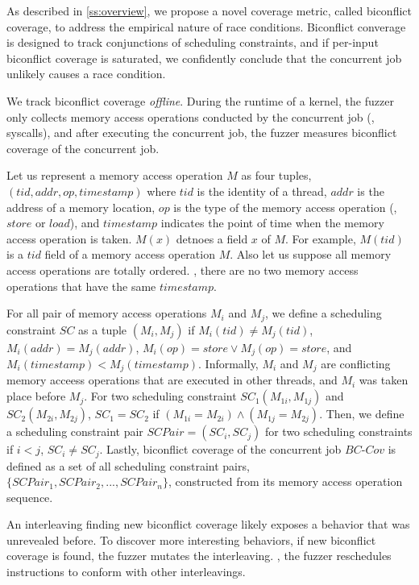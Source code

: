 As described in \autoref{ss:overview}, we propose a novel coverage
metric, called biconflict coverage, to address the empirical nature of
race conditions.
%
Biconflict converage is designed to track conjunctions of scheduling
constraints, and if per-input biconflict coverage is saturated, we
confidently conclude that the concurrent job unlikely causes a race
condition.

We track biconflict coverage \textit{offline}. During the runtime of a
kernel, the fuzzer only collects memory access operations conducted by
the concurrent job (\eg, syscalls), and after executing the concurrent
job, the fuzzer measures biconflict coverage of the concurrent job.

%
Let us represent a memory access operation $M$ as four tuples,
$(tid, addr, op, timestamp)$ where $tid$ is the identity of a thread,
$addr$ is the address of a memory location, $op$ is the type of the
memory access operation (\ie, $store$ or $load$), and $timestamp$
indicates the point of time when the memory access operation is taken.
%
$M(x)$ detnoes a field $x$ of $M$. For example, $M(tid)$ is a $tid$
field of a memory access operation $M$.
%
Also let us suppose all memory access operations are totally
ordered. \ie, there are no two memory access operations that have the
same $timestamp$.

For all pair of memory access operations $M_i$ and $M_j$, we define a
scheduling constraint $SC$ as a tuple $(M_i, M_j)$ if
$M_i(tid) \neq M_j(tid)$, $M_i(addr) = M_j(addr)$,
$M_i(op) = store \vee M_j(op) = store$, and
$M_i(timestamp) < M_j(timestamp)$.
%
Informally, $M_i$ and $M_j$ are conflicting memory acceess operations
that are executed in other threads, and $M_i$ was taken place before
$M_j$.
%
For two scheduling constraint $SC_1(M_{1i}, M_{1j})$ and
$SC_2(M_{2i}, M_{2j})$, $SC_1 = SC_2$ if
$(M_{1i} = M_{2i}) \wedge (M_{1j} = M_{2j})$.
%
Then, we define a scheduling constraint pair $SCPair = (SC_i, SC_j)$
for two scheduling constraints if $i < j$, $SC_i \neq SC_j$.
%
Lastly, biconflict coverage of the concurrent job $BC\mbox{-}Cov$ is
defined as a set of all scheduling constraint pairs,
$\{SCPair_1, SCPair_2, ..., SCPair_n\}$, constructed from its memory
access operation sequence.



%
An interleaving finding new biconflict coverage likely exposes a
behavior that was unrevealed before.
%
To discover more interesting behaviors, if new biconflict coverage is
found, the fuzzer mutates the interleaving. \ie, the fuzzer
reschedules instructions to conform with other interleavings.

